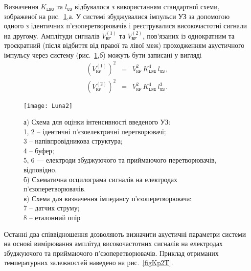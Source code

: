Визначення $K_\mathtt{LNO}$ та $l_\mathtt{US}$ відбувалося з використанням стандартної схеми,
зображеної на рис.~\ref{Luna2},а.
У системі збуджувалися імпульси УЗ за допомогою одного з ідентичних п'єзоперетворювачів і реєструвалися
високочастотні сигнали на другому.
Амплітуди сигналів $V_\mathtt{RF}^{(1)}$ та $V_\mathtt{RF}^{(2)}$, пов'язаних із однократним та троєкратний (після відбиття від правої та лівої меж) проходженням акустичного імпульсу через систему
(рис.~\ref{Luna2},б) можуть бути записані у вигляді
\begin{eqnarray}
  \label{eqVrf1} (V_\mathtt{RF}^{(1)})^2&=&V_\mathtt{RF}^2\,K_\mathtt{LNO}^4\,l_\mathtt{US}, \\
  \label{eqVrf2} (V_\mathtt{RF}^{(2)})^2&=&V_\mathtt{RF}^2\,K_\mathtt{LNO}^4\,l_\mathtt{US}^3.
\end{eqnarray}


\begin{figure}
\center
\texttt{[image: Luna2]}%
\caption{\label{Luna2}
а) Схема для оцінки інтенсивності введеного УЗ:\protect\\
1, 2 -- ідентичні п'єзоелектричні перетворювачі; \protect\\
3 -- напівпровідникова структура;\protect\\
4 -- буфер; \protect\\
5, 6 --- електроди збуджуючого та приймаючого перетворювачів, відповідно. \protect\\
б) Схематична осцилограма сигналів на електродах п'єзоперетворювачів. \protect\\
в) Схема для визначення імпедансу п'єзоперетворювача: \protect\\
7 -- датчик струму; \protect\\
8 -- еталонний опір
}
\end{figure}

Останні два співвідношення дозволяють визначити акустичні параметри системи на основі вимірювання амплітуд
високочастотних сигналів на електродах збуджуючого та приймаючого п'єзоперетворювачів.
Приклад отриманих температурних залежностей наведено на рис.~\ref{figKp2T}.

